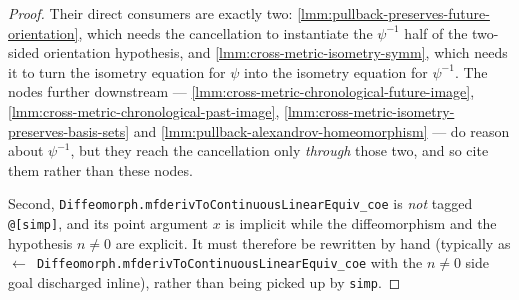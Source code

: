 \begin{proof}
    Their direct consumers are exactly two: \ref{lmm:pullback-preserves-future-orientation}, which needs the cancellation to instantiate the $\psi^{-1}$ half of the two-sided orientation hypothesis, and \ref{lmm:cross-metric-isometry-symm}, which needs it to turn the isometry equation for $\psi$ into the isometry equation for $\psi^{-1}$. The nodes further downstream --- \ref{lmm:cross-metric-chronological-future-image}, \ref{lmm:cross-metric-chronological-past-image}, \ref{lmm:cross-metric-isometry-preserves-basis-sets} and \ref{lmm:pullback-alexandrov-homeomorphism} --- do reason about $\psi^{-1}$, but they reach the cancellation only \emph{through} those two, and so cite them rather than these nodes.

    Second, \texttt{Diffeomorph.mfderivToContinuousLinearEquiv\_coe} is \emph{not} tagged \texttt{@[simp]}, and its point argument $x$ is implicit while the diffeomorphism and the hypothesis $n \neq 0$ are explicit. It must therefore be rewritten by hand (typically as \texttt{$\leftarrow$ Diffeomorph.mfderivToContinuousLinearEquiv\_coe} with the $n \neq 0$ side goal discharged inline), rather than being picked up by \texttt{simp}.
\end{proof}

